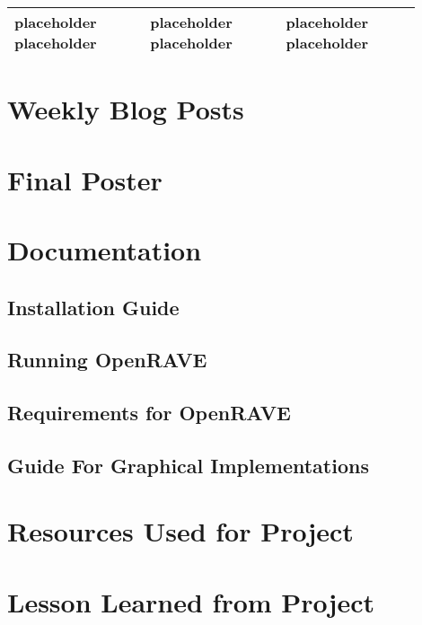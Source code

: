 \documentclass[10pt,journal,compsoc,draftclsnofoot]{IEEEtran}
\begin{document}
\begin{flushleft}
\begin{center}
\begin{table}[H]
\begin{tabular}{ | p{0.3\linewidth} | p{0.3\linewidth} | p{0.3\linewidth} | }
placeholder placeholder & 
placeholder placeholder & 
placeholder placeholder \\ \hline

\end{tabular}
\newline
\label{table:TechReviewUpdate}
\end{table}
\end{center}

\newpage

\section{Weekly Blog Posts}


\section{Final Poster}



\section{Documentation}

\subsection{Installation Guide}

\subsection{Running OpenRAVE}

\subsection{Requirements for OpenRAVE}

\subsection{Guide For Graphical Implementations}


\section{Resources Used for Project}



\section{Lesson Learned from Project}


\end{flushleft}
\end{document}
